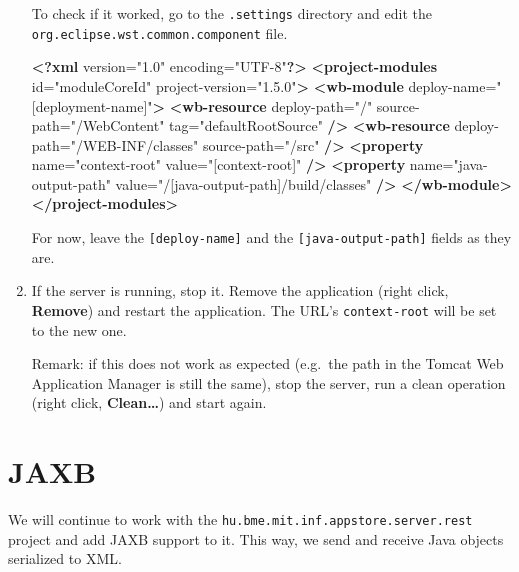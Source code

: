 \documentclass[]{report}
\newenvironment{Shaded}{}{}
\newcommand{\KeywordTok}[1]{\textcolor[rgb]{0.00,0.44,0.13}{\textbf{{#1}}}}
\newcommand{\StringTok}[1]{\textcolor[rgb]{0.25,0.44,0.63}{{#1}}}
\newcommand{\OtherTok}[1]{\textcolor[rgb]{0.00,0.44,0.13}{{#1}}}
\newcommand{\NormalTok}[1]{{#1}}
\begin{document}
\begin{enumerate}
  To check if it worked, go to the \texttt{.settings} directory and edit
  the \texttt{org.eclipse.wst.common.component} file.

\begin{Shaded}
\begin{Highlighting}[]
\KeywordTok{<?xml} \NormalTok{version="1.0" encoding="UTF-8"}\KeywordTok{?>}
\KeywordTok{<project-modules}\OtherTok{ id=}\StringTok{"moduleCoreId"}\OtherTok{ project-version=}\StringTok{"1.5.0"}\KeywordTok{>}
  \KeywordTok{<wb-module}\OtherTok{ deploy-name=}\StringTok{"[deployment-name]"}\KeywordTok{>}
    \KeywordTok{<wb-resource}\OtherTok{ deploy-path=}\StringTok{"/"}\OtherTok{ source-path=}\StringTok{"/WebContent"}\OtherTok{ tag=}\StringTok{"defaultRootSource"} \KeywordTok{/>}
    \KeywordTok{<wb-resource}\OtherTok{ deploy-path=}\StringTok{"/WEB-INF/classes"}\OtherTok{ source-path=}\StringTok{"/src"} \KeywordTok{/>}
    \KeywordTok{<property}\OtherTok{ name=}\StringTok{"context-root"}\OtherTok{ value=}\StringTok{"[context-root]"} \KeywordTok{/>}
    \KeywordTok{<property}\OtherTok{ name=}\StringTok{"java-output-path"}\OtherTok{ value=}\StringTok{"/[java-output-path]/build/classes"} \KeywordTok{/>}
  \KeywordTok{</wb-module>}
\KeywordTok{</project-modules>}
\end{Highlighting}
\end{Shaded}

  For now, leave the \texttt{{[}deploy-name{]}} and the
  \texttt{{[}java-output-path{]}} fields as they are.
\item
  If the server is running, stop it. Remove the application (right
  click, \textbf{Remove}) and restart the application. The URL's
  \texttt{context-root} will be set to the new one.

  Remark: if this does not work as expected (e.g.~the path in the Tomcat
  Web Application Manager is still the same), stop the server, run a
  clean operation (right click, \textbf{Clean\ldots{}}) and start again.
\end{enumerate}

\section{JAXB}

We will continue to work with the
\texttt{hu.bme.mit.inf.appstore.server.rest} project and add JAXB
support to it. This way, we send and receive Java objects serialized to
XML.
\end{document}
